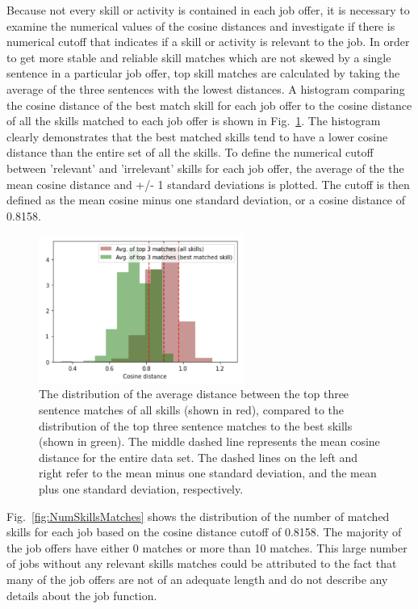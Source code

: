 Because not every skill or activity is contained in each job offer, it is necessary to examine the numerical values of the cosine distances and investigate if there is numerical cutoff that indicates if a skill or activity is relevant to the job. In order to get more stable and reliable skill matches which are not skewed by a single sentence in a particular job offer, top skill matches are calculated by taking the average of the three sentences with the lowest distances. A histogram comparing the cosine distance of the best match skill for each job offer to the cosine distance of all the skills matched to each job offer is shown in Fig.~\ref{fig:SkillHist1}. The histogram clearly demonstrates that the best matched skills tend to have a lower cosine distance than the entire set of all the skills. To define the numerical cutoff between 'relevant' and 'irrelevant' skills for each job offer, the average of the the mean cosine distance and +/- 1 standard deviations is plotted. The cutoff is then defined as the mean cosine minus one standard deviation, or a cosine distance of 0.8158. 


\begin{figure}[htbp]
  \centering
    \includegraphics[width=0.6\textwidth]{figures/SkillHist1.pdf}
    \caption[Comparison of the average distance between the top three sentence matches of all skills and the top three sentence matches to the best skills]{
    The distribution of the average distance between the top three sentence matches of all skills (shown in red), compared to the distribution of the top three sentence matches to the best skills (shown in green). The middle dashed line represents the mean cosine distance for the entire data set. The dashed lines on the left and right refer to the mean minus one standard deviation, and the mean plus one standard deviation, respectively. 
    }
\label{fig:SkillHist1}
\end{figure}

Fig.~\ref{fig:NumSkillsMatches} shows the distribution of the number of matched skills for each job based on the cosine distance cutoff of 0.8158. The majority of the job offers have either 0 matches or more than 10 matches. This large number of jobs without any relevant skills matches could be attributed to the fact that many of the job offers are not of an adequate length and do not describe any details about the job function. 


